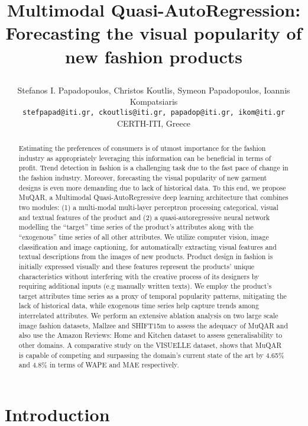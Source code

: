 \documentclass{article}
\title{Multimodal Quasi-AutoRegression: Forecasting the visual popularity of new fashion products

}
\author{
  Stefanos I. Papadopoulos, 
  Christos Koutlis,
  Symeon Papadopoulos, 
  Ioannis Kompatsiaris
  \\
  \texttt{stefpapad@iti.gr, ckoutlis@iti.gr, papadop@iti.gr, ikom@iti.gr} \\
  CERTH-ITI, Greece\\
}
\begin{document}
\maketitle


\begin{abstract}

Estimating the preferences of consumers is of utmost importance for the fashion industry as appropriately leveraging this information can be beneficial in terms of profit. Trend detection in fashion is a  challenging task due to the fast pace of change in the fashion industry. 
Moreover, forecasting the visual popularity of new garment designs is even more demanding due to lack of historical data.
To this end, we propose MuQAR, a Multimodal Quasi-AutoRegressive deep learning architecture that combines two modules: (1) a multi-modal multi-layer perceptron processing categorical, visual and textual features of the product and (2) a quasi-autoregressive neural network modelling the ``target'' time series of the product's attributes along with the ``exogenous'' time series of all other attributes. 
We utilize computer vision, image classification and image captioning, for automatically extracting visual features and textual descriptions from the images of new products.
Product design in fashion is initially expressed visually and these features represent the products' unique characteristics without interfering with the creative process of its designers by requiring additional inputs (e.g manually written texts).
We employ the product's target attributes time series as a proxy of temporal popularity patterns, mitigating the lack of historical data, while exogenous time series help capture trends among interrelated attributes.
We perform an extensive ablation analysis on two large scale image fashion datasets, Mallzee and SHIFT15m to assess the adequacy of MuQAR and also use the Amazon Reviews: Home and Kitchen dataset to assess generalisability to other domains. A comparative study on the VISUELLE dataset, shows that MuQAR is capable of competing and surpassing the domain's current state of the art by 4.65\% and 4.8\% in terms of WAPE and MAE respectively.

\end{abstract}




\section{Introduction}
\end{document}
